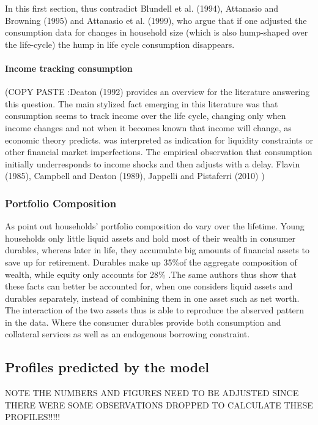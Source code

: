 \documentclass[a4paper,12pt]{article}
\begin{document}
In this first section, \cite{FV&K2011} thus contradict Blundell et al. (1994), Attanasio and Browning (1995) and Attanasio et al. (1999), who argue that if one adjusted the consumption data for changes in household size (which is also hump-shaped over the life-cycle) the hump in life cycle consumption disappears. 

\paragraph{Income tracking consumption}

(COPY PASTE :Deaton (1992) provides an overview for the literature answering this question. The main stylized fact emerging in this literature was that consumption seems to track income over the life cycle, changing only when income changes and not when it becomes known that income will change, as economic theory predicts. was interpreted as indication for liquidity constraints or other financial market imperfections. The empirical observation that consumption initially underresponds to income shocks and then adjusts with a delay. Flavin (1985), Campbell and Deaton (1989), Jappelli and Pistaferri (2010) )

\subsubsection{Portfolio Composition} 
As \cite{FV&K2011} point out households' portfolio composition do vary over the lifetime. Young households only little liquid assets and hold most of their wealth in consumer durables, whereas later in life, they accumulate big amounts of financial assets to save up for retirement. Durables make up 35\%of the aggregate composition of wealth, while equity only accounts for 28\% \citep{FV&K2011}.The same authors thus show that these facts can better be accounted for, when one considers liquid assets and durables separately, instead of combining them in one asset such as net worth. The interaction of the two assets thus is able to reproduce the abserved pattern in the data. Where the consumer durables provide both consumption and collateral services as well as an endogenous borrowing constraint. 

\subsection{Profiles predicted by the model}

NOTE THE NUMBERS AND FIGURES NEED TO BE ADJUSTED SINCE THERE WERE SOME OBSERVATIONS DROPPED TO CALCULATE THESE PROFILES!!!!!
\end{document}
